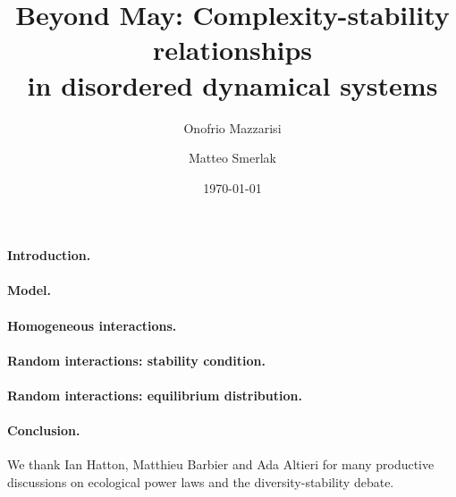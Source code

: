 \documentclass[
 prl,
 twocolumn,
 amsmath,
 amssymb,
 aps,
]{revtex4-2}
\begin{document}
\title{Beyond May: Complexity-stability relationships \\
in disordered dynamical systems}

\author{Onofrio Mazzarisi}

\author{Matteo Smerlak}


\date{\today}

\begin{abstract}

\end{abstract}
\maketitle

\paragraph*{\bf Introduction.}


\paragraph*{\bf Model.}


\paragraph*{\bf Homogeneous interactions.}


\paragraph*{\bf Random interactions: stability condition.}


\paragraph*{\bf Random interactions: equilibrium distribution.}


\paragraph*{\bf Conclusion.}


\medskip

\begin{acknowledgments}
We thank Ian Hatton, Matthieu Barbier and Ada Altieri for many productive discussions on ecological power laws and the diversity-stability debate. 
\end{acknowledgments}

\medskip



\end{document}
